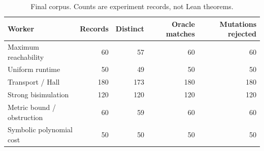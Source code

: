 \begin{table}[htbp]\centering\small
\begin{tabular}{@{}lrrrr@{}}\toprule
Worker & Records & Distinct & Oracle matches & Mutations rejected\\\midrule
Maximum reachability & 60 & 57 & 60 & 60 \\
Uniform runtime & 50 & 49 & 50 & 50 \\
Transport / Hall & 180 & 173 & 180 & 180 \\
Strong bisimulation & 120 & 120 & 120 & 120 \\
Metric bound / obstruction & 60 & 59 & 60 & 60 \\
Symbolic polynomial cost & 50 & 50 & 50 & 50 \\
\bottomrule\end{tabular}
\caption{Final corpus. Counts are experiment records, not Lean theorems.}\end{table}
